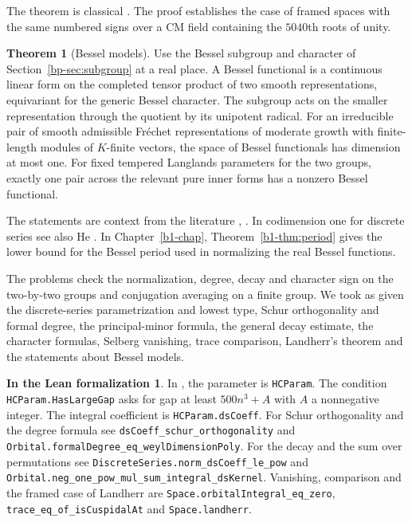 \documentclass[reqno]{amsart}
\newcounter{chap}
\theoremstyle{definition}
\newtheorem{theorem}{Theorem}
\newtheorem*{leanremark}{In the Lean formalization}
\newcommand{\tl}[1]{\texttt{#1}}
\begin{document}
\noindent The theorem is classical \cite[\S5.5]{Kne}. The proof establishes the case of framed spaces with the same numbered signs over a CM field containing the \(5040\)th roots of unity.

\begin{theorem}[Bessel models]
Use the Bessel subgroup and character of Section~\ref{bp-sec:subgroup} at a real place. A Bessel functional is a continuous linear form on the completed tensor product of two smooth representations, equivariant for the generic Bessel character. The subgroup acts on the smaller representation through the quotient by its unipotent radical. For an irreducible pair of smooth admissible Fr\'echet representations of moderate growth with finite-length modules of \(K\)-finite vectors, the space of Bessel functionals has dimension at most one. For fixed tempered Langlands parameters for the two groups, exactly one pair across the relevant pure inner forms has a nonzero Bessel functional.
\end{theorem}

\noindent The statements are context from the literature \cite[Theorem~A]{JSZ}, \cite{BP,Xue}. In codimension one for discrete series see also He \cite{He}. In Chapter~\ref{b1-chap}, Theorem~\ref{b1-thm:period} gives the lower bound for the Bessel period used in normalizing the real Bessel functions.

\medskip
The problems check the normalization, degree, decay and character sign on the two-by-two groups and conjugation averaging on a finite group. We took as given the discrete-series parametrization and lowest type, Schur orthogonality and formal degree, the principal-minor formula, the general decay estimate, the character formulas, Selberg vanishing, trace comparison, Landherr's theorem and the statements about Bessel models.

\begin{leanremark}
\raggedright
In \cite{GL}, the parameter is \tl{HCParam}. The condition \tl{HCParam.HasLargeGap} asks for gap at least \(500n^3+A\) with \(A\) a nonnegative integer. The integral coefficient is \tl{HCParam.dsCoeff}. For Schur orthogonality and the degree formula see \tl{dsCoeff\_schur\_orthogonality} and \tl{Orbital.formalDegree\_eq\_weylDimensionPoly}. For the decay and the sum over permutations see \tl{DiscreteSeries.norm\_dsCoeff\_le\_pow} and \tl{Orbital.neg\_one\_pow\_mul\_sum\_integral\_dsKernel}. Vanishing, comparison and the framed case of Landherr are \tl{Space.orbitalIntegral\_eq\_zero}, \tl{trace\_eq\_of\_isCuspidalAt} and \tl{Space.landherr}.
\end{leanremark}
\end{document}
